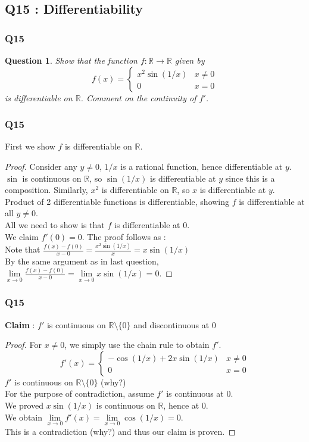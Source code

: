 \documentclass[handout,aspectratio=169]{beamer}
\newtheorem{qsn}{Question}
\newcommand{\bR}{\mathbb{R}}
\begin{document}
\subsection{Q15 : Differentiability}

\begin{frame}
\frametitle{Q15}
\pause
\begin{qsn}
Show that the function $f : \bR \to \bR$ given by
$$f(x) = 
\begin{cases}
x^2 \sin (1/x) & x\neq 0\\
0 & x=0
\end{cases}$$
is differentiable on $\bR$. Comment on the continuity of $f'$.
\end{qsn}
\end{frame}

\begin{frame}
\frametitle{Q15}
First we show $f$ is differentiable on $\bR$.
\pause
\begin{proof}
Consider any $y\neq 0$, $1/x$ is a rational function, hence differentiable at $y$. $\sin$ is continuous on $\bR$, so $\sin(1/x)$ is differentiable at $y$ since this is a composition. Similarly, $x^2$ is differentiable on $\bR$, so $x$ is differentiable at $y$. Product of 2 differentiable functions is differentiable, showing $f$ is differentiable at all $y\neq 0$.\\[1mm] \pause
All we need to show is that $f$ is differentiable at $0$.\\ \pause
We claim $f'(0) = 0$. The proof follows as :\\ \pause
Note that $\frac{f(x)-f(0)}{x-0} = \frac{x^2\sin(1/x)}{x} = x\sin(1/x)$\\ \pause
By the same argument as in last question, $\lim\limits_{x\to 0} \frac{f(x)-f(0)}{x-0} = \lim\limits_{x\to 0} x\sin(1/x) = 0$.
\end{proof}
\end{frame}

\begin{frame}
\frametitle{Q15}
\textbf{Claim} : $f'$ is continuous on $\bR\setminus \{0\}$ and discontinuous at 0
\pause
\begin{proof}
For $x\neq 0$, we simply use the chain rule to obtain $f'$.\\ \pause
$$f'(x) = \begin{cases}
-\cos(1/x) + 2x\sin(1/x) & x\neq 0\\
0 & x=0
\end{cases}
$$
\pause
$f'$ is continuous on $\bR \setminus \{0\}$ (why?) \\ \pause
For the purpose of contradiction, assume $f'$ is continuous at 0.\\ \pause
We proved $x\sin(1/x)$ is continuous on $\bR$, hence at 0.\\ \pause
We obtain $\lim\limits_{x\to 0} f'(x) = \lim\limits_{x\to 0} \cos(1/x) = 0$. \\ \pause
This is a contradiction (why?) and thus our claim is proven.
\end{proof}
\end{frame}
\end{document}
